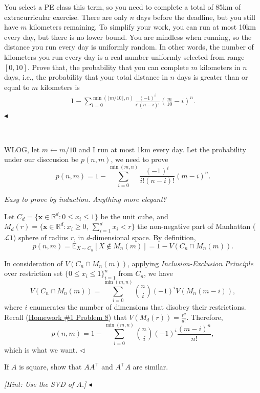 ﻿\documentclass[11pt]{article}
\newenvironment{problem}[2][Problem]{\begin{trivlist}
\item[\hskip \labelsep {\bfseries #1}\hskip \labelsep {\bfseries #2.}]}{\hfill$\blacktriangleleft$\end{trivlist}}
\newenvironment{answer}[1][Answer]{\begin{trivlist}
\item[\hskip \labelsep {\bfseries #1.}\hskip \labelsep]}{\hfill$\lhd$\end{trivlist}}
\newcommand\E{\mathbb{E}}
\begin{document}
\begin{problem}{2 (16')}
You select a PE class this term, so you need to complete a total of 85km of extracurricular exercise. There are only $n$ days before the deadline, but you still have $m$ kilometers remaining. To simplify your work, you can run at most 10km every day, but there is no lower bound. You are mindless when running, so the distance you run every day is uniformly random. In other words, the number of kilometers you run every day is a real number uniformly selected from range $[0,10]$. Prove that, the probability that you can complete $m$ kilometers in $n$ days, i.e., the probability that your total distance in $n$ days is greater than or equal to $m$ kilometers is 
\begin{align*}
    1-\sum_{i=0}^{\min(\lfloor m/10\rfloor,n)}\frac{(-1)^i}{i!(n-i)!}\left(\frac{m}{10}-i\right)^n.
\end{align*}
\end{problem}

\begin{answer} ~

    WLOG, let $m\gets m/10$ and I run at most 1km every day. Let the probability under our disccusion be $p(n,m)$, we need to prove
    $$
        p(n,m)=1-\sum_{i=0}^{\min(m,n)}\frac{(-1)^i}{i!(n-i)!}\left(m-i\right)^n.
    $$

    \textit{Easy to prove by induction. Anything more elegant?}

    Let $C_d=\{\boldsymbol{x}\in\mathbb R^d:0\le x_i\le 1\}$ be the unit cube, and $M_d(r)=\{\boldsymbol{x}\in\mathbb R^d:x_i\ge 0,~\sum_{i=1}^d x_i<r\}$ the non-negative part of Manhattan ($\mathcal L1$) sphere of radius $r$, in $d$-dimensional space. By definition,
    $$
        p(n,m)=\E_{X\sim C_n}[X\notin M_n(m)]=1-V(C_n\cap M_n(m)).
    $$

    In consideration of $V(C_n\cap M_n(m))$, applying \textit{Inclusion-Exclusion Principle} over restriction set $\{0\le x_i\le 1\}_{i=1}^n$ from $C_n$, we have
    $$
        V(C_n\cap M_n(m)) = \sum_{i=0}^{\min(m,n)}\binom{n}{i}(-1)^i V(M_n(m-i)),
    $$
    where $i$ enumerates the number of dimensions that disobey their restrictions. Recall (\underline{Homework \#1 Problem 8}) that $V(M_d(r)) = \frac{r^d}{d!}$. Therefore,
    $$
        p(n,m) = 1-\sum_{i=0}^{\min(m,n)}\binom{n}{i}(-1)^i \frac{(m-i)^n}{n!},
    $$
    which is what we want.
\end{answer}


\begin{problem}{3 (10')}
If $A$ is square, show that $AA^\top$ and $A^\top A$ are similar.

\textit{[Hint: Use the SVD of $A$.]}
\end{problem}
\end{document}
